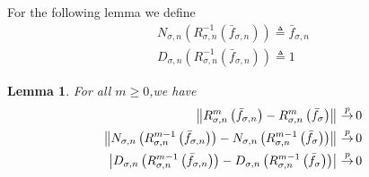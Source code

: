 \documentclass{article} %
\def\kde{{\bar{f}_{\sigma,n}}} %
\def\gkde{{\bar{f}_\sigma}} %
\def\cip{\,{\buildrel p \over \rightarrow}\,}
\def\l{\left}
\def\r{\right}
\newtheorem{lem}{Lemma}
\theoremstyle{definition}
\begin{document}
For the following lemma we define
\begin{eqnarray*}
    N_{\sigma,n}\left( R_{\sigma,n}^{-1}\left( \kde \right) \right) \triangleq \kde\\
    D_{\sigma,n}\left( R_{\sigma,n}^{-1}\left( \kde \right) \right) \triangleq 1
\end{eqnarray*}
\begin{lem}
	For all $m\ge 0$,we have
	\begin{eqnarray*}
		\l\|R_{\sigma,n}^m\left( \kde \right) - R_{\sigma,n}^m\left( \gkde \right)\r\| \cip 0 \\
		\l\| N_{\sigma,n}\left( R_{\sigma,n}^{m-1}\left( \kde \right) \right) - N_{\sigma,n}\left( R_{\sigma,n}^{m-1}\left( \gkde \right) \right) \r\| \cip 0 \\
		\l| D_{\sigma,n}\left( R_{\sigma,n}^{m-1}\left( \kde \right) \right) - D_{\sigma,n}\left( R_{\sigma,n}^{m-1}\left( \gkde \right) \right) \r| \cip 0 
	\end{eqnarray*}
\end{lem}
\end{document}
